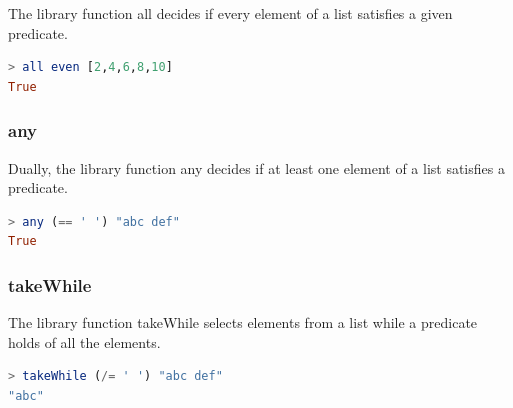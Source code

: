 The library function all decides if every element of a list satisfies a
given predicate.

\begin{lstlisting}[language=Haskell]
> all even [2,4,6,8,10]
True
\end{lstlisting}

\hypertarget{any}{%
\subsubsection{any}\label{any}}

Dually, the library function any decides if at least one element of a
list satisfies a predicate.

\begin{lstlisting}[language=Haskell]
> any (== ' ') "abc def"
True
\end{lstlisting}

\hypertarget{takewhile}{%
\subsubsection{takeWhile}\label{takewhile}}

The library function takeWhile selects elements from a list while a
predicate holds of all the elements.

\begin{lstlisting}[language=Haskell]
> takeWhile (/= ' ') "abc def"
"abc"
\end{lstlisting}


\clearpage